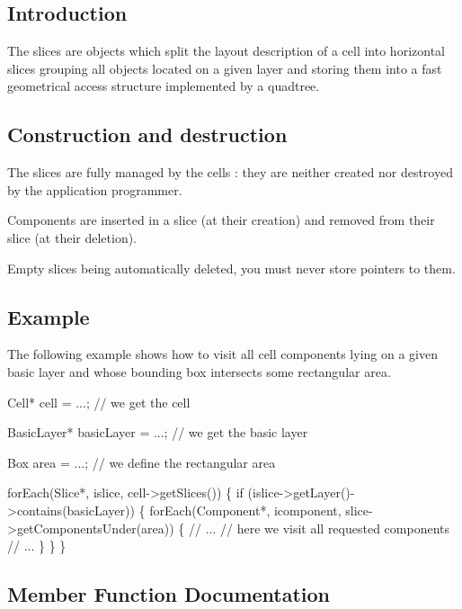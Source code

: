 \hypertarget{classHurricane_1_1Slice_secSliceIntro}{}\subsection{Introduction}\label{classHurricane_1_1Slice_secSliceIntro}
The slices are objects which split the layout description of a cell into horizontal slices grouping all objects located on a given layer and storing them into a fast geometrical access structure implemented by a quadtree.\hypertarget{classHurricane_1_1Slice_secSliceConstructionAndDestruction}{}\subsection{Construction and destruction}\label{classHurricane_1_1Slice_secSliceConstructionAndDestruction}
The slices are fully managed by the cells \+: they are neither created nor destroyed by the application programmer.

Components are inserted in a slice (at their creation) and removed from their slice (at their deletion).

Empty slices being automatically deleted, you must never store pointers to them.\hypertarget{classHurricane_1_1Slice_secSliceExample}{}\subsection{Example}\label{classHurricane_1_1Slice_secSliceExample}
The following example shows how to visit all cell components lying on a given basic layer and whose bounding box intersects some rectangular area. 
\begin{DoxyCode}
Cell* cell = ...; \textcolor{comment}{// we get the cell}
 
BasicLayer* basicLayer = ...; \textcolor{comment}{// we get the basic layer}
 
Box area = ...; \textcolor{comment}{// we define the rectangular area}
 
forEach(Slice*, islice, cell->getSlices()) \{
  \textcolor{keywordflow}{if} (islice->getLayer()->contains(basicLayer)) \{
    forEach(Component*, icomponent, slice->getComponentsUnder(area)) \{
      \textcolor{comment}{// ...}
      \textcolor{comment}{// here we visit all requested components}
      \textcolor{comment}{// ...}
    \}
  \}
\}
\end{DoxyCode}
 

\subsection{Member Function Documentation}
\mbox{\label{classHurricane_1_1Slice_ae7a75f373a3d4e8878007c38688000f8}} 

